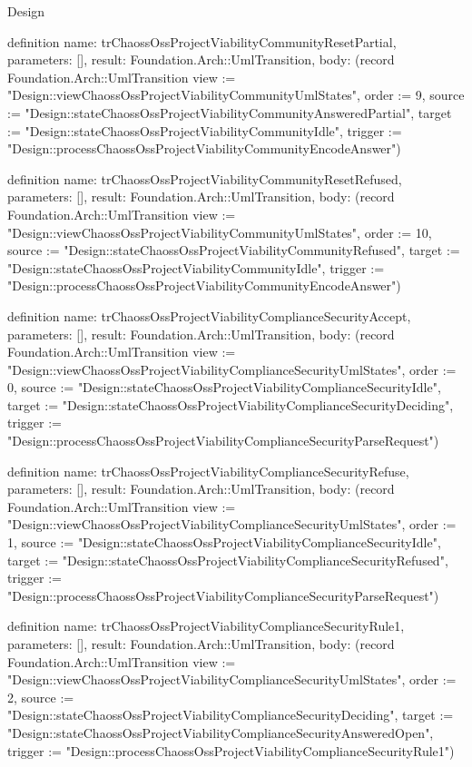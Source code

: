 \begin{lexlean}{Design}
\begin{semanticmodule}
definition{
  name: trChaossOssProjectViabilityCommunityResetPartial,
  parameters: [],
  result: Foundation.Arch::UmlTransition,
  body: (record Foundation.Arch::UmlTransition {view := "Design::viewChaossOssProjectViabilityCommunityUmlStates", order := 9, source := "Design::stateChaossOssProjectViabilityCommunityAnsweredPartial", target := "Design::stateChaossOssProjectViabilityCommunityIdle", trigger := "Design::processChaossOssProjectViabilityCommunityEncodeAnswer"})
}

definition{
  name: trChaossOssProjectViabilityCommunityResetRefused,
  parameters: [],
  result: Foundation.Arch::UmlTransition,
  body: (record Foundation.Arch::UmlTransition {view := "Design::viewChaossOssProjectViabilityCommunityUmlStates", order := 10, source := "Design::stateChaossOssProjectViabilityCommunityRefused", target := "Design::stateChaossOssProjectViabilityCommunityIdle", trigger := "Design::processChaossOssProjectViabilityCommunityEncodeAnswer"})
}

definition{
  name: trChaossOssProjectViabilityComplianceSecurityAccept,
  parameters: [],
  result: Foundation.Arch::UmlTransition,
  body: (record Foundation.Arch::UmlTransition {view := "Design::viewChaossOssProjectViabilityComplianceSecurityUmlStates", order := 0, source := "Design::stateChaossOssProjectViabilityComplianceSecurityIdle", target := "Design::stateChaossOssProjectViabilityComplianceSecurityDeciding", trigger := "Design::processChaossOssProjectViabilityComplianceSecurityParseRequest"})
}

definition{
  name: trChaossOssProjectViabilityComplianceSecurityRefuse,
  parameters: [],
  result: Foundation.Arch::UmlTransition,
  body: (record Foundation.Arch::UmlTransition {view := "Design::viewChaossOssProjectViabilityComplianceSecurityUmlStates", order := 1, source := "Design::stateChaossOssProjectViabilityComplianceSecurityIdle", target := "Design::stateChaossOssProjectViabilityComplianceSecurityRefused", trigger := "Design::processChaossOssProjectViabilityComplianceSecurityParseRequest"})
}

definition{
  name: trChaossOssProjectViabilityComplianceSecurityRule1,
  parameters: [],
  result: Foundation.Arch::UmlTransition,
  body: (record Foundation.Arch::UmlTransition {view := "Design::viewChaossOssProjectViabilityComplianceSecurityUmlStates", order := 2, source := "Design::stateChaossOssProjectViabilityComplianceSecurityDeciding", target := "Design::stateChaossOssProjectViabilityComplianceSecurityAnsweredOpen", trigger := "Design::processChaossOssProjectViabilityComplianceSecurityRule1"})
}


\end{semanticmodule}
\end{lexlean}

